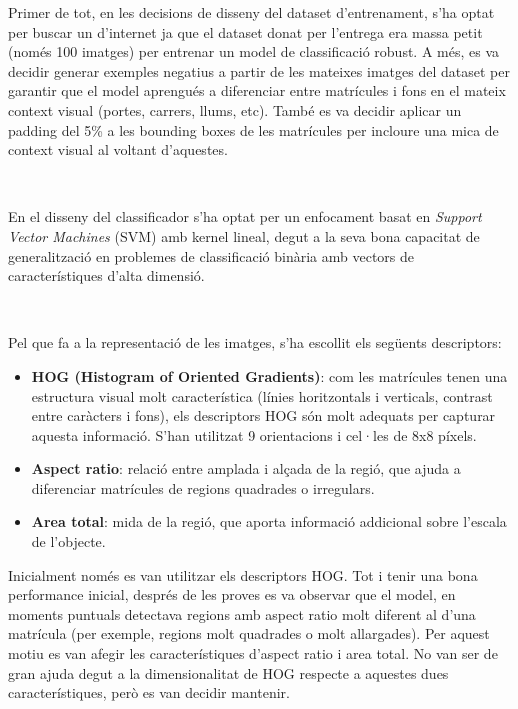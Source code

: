 Primer de tot, en les decisions de disseny del dataset d'entrenament, s'ha optat per buscar un d'internet ja que el dataset donat per l'entrega era massa petit (només 100 imatges) per entrenar un model de classificació robust. A més, es va decidir generar exemples negatius a partir de les mateixes imatges del dataset per garantir que el model aprengués a diferenciar entre matrícules i fons en el mateix context visual (portes, carrers, llums, etc). 
També es va decidir aplicar un padding del 5\% a les bounding boxes de les matrícules per incloure una mica de context visual al voltant d'aquestes.

\

En el disseny del classificador s'ha optat per un enfocament basat en \textit{Support Vector Machines} (SVM) amb kernel lineal, degut a la seva bona capacitat de generalització en problemes de classificació binària amb vectors de característiques d'alta dimensió.

\ 

Pel que fa a la representació de les imatges, s'ha escollit els següents descriptors:

\begin{itemize}
    \item \textbf{HOG (Histogram of Oriented Gradients)}: com les matrícules tenen una estructura visual molt característica (línies horitzontals i verticals, contrast entre caràcters i fons), els descriptors HOG són molt adequats per capturar aquesta informació. S'han utilitzat 9 orientacions i cel·les de 8x8 píxels.
    \item \textbf{Aspect ratio}: relació entre amplada i alçada de la regió, que ajuda a diferenciar matrícules de regions quadrades o irregulars.
    \item \textbf{Area total}: mida de la regió, que aporta informació addicional sobre l'escala de l'objecte.
\end{itemize}

Inicialment només es van utilitzar els descriptors HOG. Tot i tenir una bona performance inicial, després de les proves es va observar que el model, en moments puntuals detectava regions amb aspect ratio molt diferent al d'una matrícula (per exemple, regions molt quadrades o molt allargades). Per aquest motiu es van afegir les característiques d'aspect ratio i area total. No van ser de gran ajuda degut a la dimensionalitat de HOG respecte a aquestes dues característiques, però es van decidir mantenir. 

\

